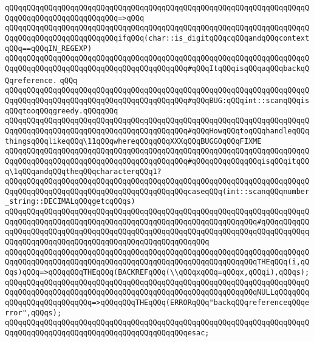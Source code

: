 \verb|qQQqqQQqqQQqqQQqqQQqqQQqqQQqqQQqqQQqqQQqqQQqqQQqqQQqqQQqqQQqqQQqqQQqqQQqqQQqqQQqqQQqqQQqqQQqqQQq=>qQQq|\newline
\verb|qQQqqQQqqQQqqQQqqQQqqQQqqQQqqQQqqQQqqQQqqQQqqQQqqQQqqQQqqQQqqQQqqQQqqQQqqQQqqQQqqQQqqQQqqQQqqQQqifqQQq(char::is_digitqQQqcqQQqandqQQqcontextqQQq==qQQqIN_REGEXP)|\newline
\newline
\verb|qQQqqQQqqQQqqQQqqQQqqQQqqQQqqQQqqQQqqQQqqQQqqQQqqQQqqQQqqQQqqQQqqQQqqQQqqQQqqQQqqQQqqQQqqQQqqQQqqQQqqQQqqQQqqQQq#qQQqItqQQqisqQQqaqQQqbackqQQqreference.|\newline
\verb|qQQq|\newline
\verb|qQQqqQQqqQQqqQQqqQQqqQQqqQQqqQQqqQQqqQQqqQQqqQQqqQQqqQQqqQQqqQQqqQQqqQQqqQQqqQQqqQQqqQQqqQQqqQQqqQQqqQQqqQQqqQQq#qQQqBUG:qQQqint::scanqQQqisqQQqtooqQQqgreedy.qQQqqQQq|\newline
\verb|qQQqqQQqqQQqqQQqqQQqqQQqqQQqqQQqqQQqqQQqqQQqqQQqqQQqqQQqqQQqqQQqqQQqqQQqqQQqqQQqqQQqqQQqqQQqqQQqqQQqqQQqqQQqqQQq#qQQqHowqQQqtoqQQqhandleqQQqthingsqQQqlikeqQQq\11qQQqwhereqQQqqQQqXXXqQQqBUGGOqQQqFIXME|\newline
\verb|qQQqqQQqqQQqqQQqqQQqqQQqqQQqqQQqqQQqqQQqqQQqqQQqqQQqqQQqqQQqqQQqqQQqqQQqqQQqqQQqqQQqqQQqqQQqqQQqqQQqqQQqqQQqqQQq#qQQqqQQqqQQqqQQqisqQQqitqQQq\1qQQqandqQQqtheqQQqcharacterqQQq1?|\newline
\newline
\verb|qQQqqQQqqQQqqQQqqQQqqQQqqQQqqQQqqQQqqQQqqQQqqQQqqQQqqQQqqQQqqQQqqQQqqQQqqQQqqQQqqQQqqQQqqQQqqQQqqQQqqQQqqQQqqQQqcaseqQQq(int::scanqQQqnumber_string::DECIMALqQQqgetcqQQqs)|\newline
\verb|qQQqqQQqqQQqqQQqqQQqqQQqqQQqqQQqqQQqqQQqqQQqqQQqqQQqqQQqqQQqqQQqqQQqqQQqqQQqqQQqqQQqqQQqqQQqqQQqqQQqqQQqqQQqqQQqqQQqqQQqqQQqqQQq#qQQqqQQqqQQqqQQqqQQqqQQqqQQqqQQqqQQqqQQqqQQqqQQqqQQqqQQqqQQqqQQqqQQqqQQqqQQqqQQqqQQqqQQqqQQqqQQqqQQqqQQqqQQqqQQqqQQqqQQqqQQqqQQq|\newline
\verb|qQQqqQQqqQQqqQQqqQQqqQQqqQQqqQQqqQQqqQQqqQQqqQQqqQQqqQQqqQQqqQQqqQQqqQQqqQQqqQQqqQQqqQQqqQQqqQQqqQQqqQQqqQQqqQQqqQQqqQQqqQQqqQQqTHEqQQq(i,qQQqs)qQQq=>qQQqqQQqTHEqQQq(BACKREFqQQq(\\qQQqxqQQq=qQQqx,qQQqi),qQQqs);|\newline
\verb|qQQqqQQqqQQqqQQqqQQqqQQqqQQqqQQqqQQqqQQqqQQqqQQqqQQqqQQqqQQqqQQqqQQqqQQqqQQqqQQqqQQqqQQqqQQqqQQqqQQqqQQqqQQqqQQqqQQqqQQqqQQqqQQqNULLqQQqqQQqqQQqqQQqqQQqqQQqqQQq=>qQQqqQQqTHEqQQq(ERRORqQQq"backqQQqreferenceqQQqerror",qQQqs);|\newline
\verb|qQQqqQQqqQQqqQQqqQQqqQQqqQQqqQQqqQQqqQQqqQQqqQQqqQQqqQQqqQQqqQQqqQQqqQQqqQQqqQQqqQQqqQQqqQQqqQQqqQQqqQQqqQQqqQQqesac;|\newline
